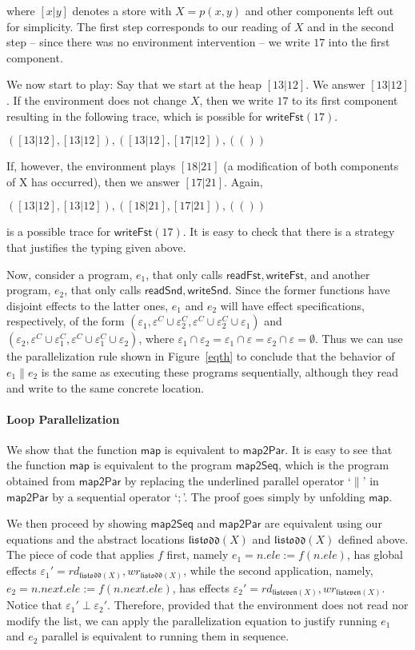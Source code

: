 \documentclass[nocopyrightspace,preprint]{sigplanconf}
\newcommand{\mypar}[2]{#1 \| #2}
\newcommand{\eff}{\varepsilon}
\newcommand{\rEff}[1]{\ensuremath{\mathit{rd}_{#1}}}
\newcommand{\wEff}[1]{\ensuremath{\mathit{wr}_{#1}}}
\newcommand{\locListOdd}{\ensuremath{\mathfrak{listodd}}\xspace}
\newcommand{\locListEven}{\ensuremath{\mathfrak{listeven}}\xspace}
\newcommand{\cloc}{\ensuremath{X}\xspace}
\begin{document}
\noindent 
where $[x|y]$ denotes a store with $X=p(x,y)$ and other components left out for simplicity.
The first step corresponds to our reading of $X$ and in the second step
-- since there was no environment intervention -- we write $17$ into the first
component.

We now start to play: Say that we start at the heap $[13|12]$. We answer $[13|12]$. If the environment does not change $X$, then we write $17$ to its first component resulting in the following trace, which is possible for $\mathsf{writeFst}(17)$.

\(
([13|12],[13|12]),([13|12],[17|12]),  (())
\)

\noindent
If, however, the environment plays $[18|21]$ (a modification of both
components of X has occurred), then we answer $[17|21]$. Again,

\(
([13|12],[13|12]),([18|21],[17|21]), (())
\)

\noindent
is a possible trace for $\mathsf{writeFst}(17)$. It is easy to check that there is a strategy that justifies the typing given above.

\noindent
Now, consider a program, $e_1$, that only calls $\mathsf{readFst},\mathsf{writeFst}$, and another program, $e_2$, that only calls $\mathsf{readSnd},\mathsf{writeSnd}$. Since the former functions have disjoint effects to the latter ones, $e_1$ and $e_2$ will have effect specifications, respectively, of the form 
$(\eff_1, \eff^C \cup \eff_2^C, \eff^C \cup \eff_2^C \cup \eff_1)$ and $(\eff_2, \eff^C \cup \eff_1^C, \eff^C \cup \eff_1^C \cup \eff_2)$, 
where $\eff_1 \cap \eff_2 = \eff_1 \cap \eff = \eff_2 \cap \eff = \emptyset$. Thus we can use the parallelization rule shown in Figure~\ref{eqth} to conclude that 
the behavior of $\mypar{e_1}{e_2}$ is the same as executing these programs sequentially, although they read and write to the same concrete location.

\paragraph{Loop Parallelization}
We show that the function $\mathsf{map}$ is equivalent to $\mathsf{map2Par}$. It is easy to see that the function $\mathsf{map}$ is equivalent to the program $\mathsf{map2Seq}$, which is the program obtained from $\mathsf{map2Par}$ by replacing the underlined parallel operator `$\|$' in $\mathsf{map2Par}$ by a sequential operator `$;$'. The proof goes simply by unfolding $\mathsf{map}$. 

We then proceed by showing $\mathsf{map2Seq}$ and $\mathsf{map2Par}$ are equivalent using our equations and the abstract locations $\locListOdd(\cloc)$ and $\locListOdd(\cloc)$ defined above. The piece of code that applies $f$ first, namely $e_1 = n.ele := f(n.ele)$, has global effects $\eff_1' = \rEff{\locListOdd(\cloc)},\wEff{\locListOdd(\cloc)}$, while the second application, namely, $e_2 = n.next.ele := f(n.next.ele)$, has effects $\eff_2' = \rEff{\locListEven(\cloc)},\wEff{\locListEven(\cloc)}$. Notice that $\eff_1'\perp\eff_2'$. Therefore, provided that the environment does not read nor modify the list, we can apply the parallelization equation to justify running $e_1$ and $e_2$ parallel is equivalent to running them in sequence.
\end{document}

